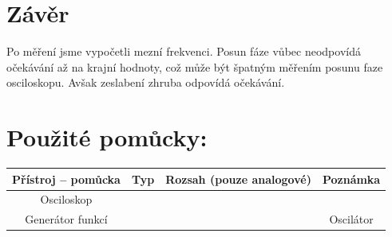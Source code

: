 \documentclass[12pt,a4paper]{article}
\begin{document}
\section*{Závěr}
Po měření jsme vypočetli mezní frekvenci. Posun fáze vůbec neodpovídá očekávání až na krajní hodnoty, což může být špatným měřením posunu faze osciloskopu. Avšak zeslabení zhruba odpovídá očekávání.
\vfill
\section*{Použité pomůcky:}
\begin{tabularx}{\linewidth}{c|c|c|c}
	Přístroj – pomůcka & Typ & Rozsah (pouze analogové)
	& Poznámka \\
	\hline
	Osciloskop & & &\\
	\hline
	Generátor funkcí & & &Oscilátor\\
\end{tabularx}
\end{document}
